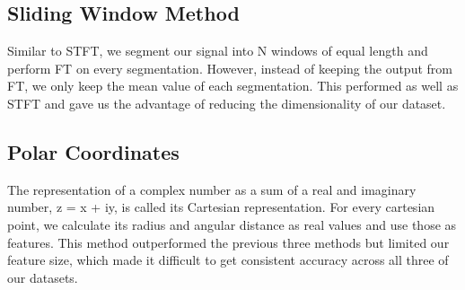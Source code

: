 \documentclass{turabian-thesis}[12pt]
\begin{document}








\subsection{Sliding Window Method}

Similar to STFT, we segment our signal into N windows of equal length and perform FT on every segmentation. However, instead of keeping the output from FT, we only keep the mean value of each segmentation. This performed as well as STFT and gave us the advantage of reducing the dimensionality of our dataset. 

\subsection{Polar Coordinates}

The representation of a complex number as a sum of a real and imaginary number, z = x + iy, is called its Cartesian representation. For every cartesian point, we calculate its radius and angular distance as real values and use those as features. This method outperformed the previous three methods but limited our feature size, which made it difficult to get consistent accuracy across all three of our datasets.
\end{document}

